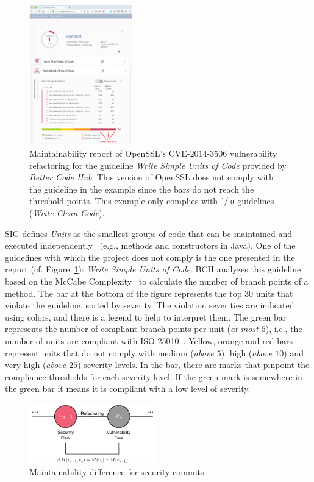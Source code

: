 \documentclass[10pt,conference]{IEEEtran}
\begin{document}
\begin{figure}[h]
 	\centering 	\includegraphics[width=0.4\textwidth]{figures/bch_report.png}
 	\caption{Maintainability report of OpenSSL's CVE-$2014$-$3506$ vulnerability
refactoring for the guideline \emph{Write Simple Units of Code} provided by
\emph{Better Code Hub}. This version of OpenSSL does not comply with the
guideline in the example since the bars do not reach the threshold points. This
example only complies with $\sfrac{1}{10}$ guidelines (\emph{Write Clean Code}).}
	\label{fig:bchrep}
\end{figure}

SIG defines \emph{Units} as the smallest groups of code that can be maintained and executed
independently~\cite{Visser:2016:OREILLY} (e.g., methods and constructors in Java).
One of the guidelines with which the project does not comply is the one presented in
the report (cf. Figure~\ref{fig:bchrep}): \emph{Write Simple Units of Code}. BCH analyzes
this guideline based on the McCabe Complexity~\cite{1702388} to calculate the number of branch
points of a method. The bar at the bottom of the figure
represents the top $30$ units that violate the guideline, sorted by severity.
The violation severities are indicated using colors, and there is a legend to
help to interpret them. The green bar represents the number of compliant
branch points per unit (\emph{at most $5$}), i.e., the number of units are compliant with
ISO 25010~\cite{iso:2011}. Yellow, orange and red bars represent units that do
not comply with medium (\emph{above $5$}), high (\emph{above $10$}) and very high
(\emph{above $25$}) severity levels. In the bar, there are marks that pinpoint the
compliance thresholds for each severity level. If the green mark is somewhere
in the green bar it means it is compliant with a low level of severity.

\begin{figure}[h]
 	\centering 	\includegraphics[width=0.49\textwidth]{figures/commit.pdf}
 	\caption{Maintainability difference for security commits}
	\label{fig:commit}
\end{figure}
\end{document}
